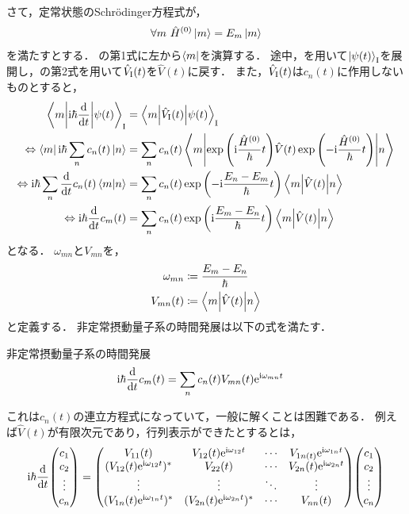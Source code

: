 \documentclass{report}
\begin{document}
  さて，定常状態のSchr\"odinger方程式が，
  \begin{align}
    \forall m\ \hat{H}^{(0)}\ket{m} = E_m\ket{m}
  \end{align}
  を満たすとする．
  の第1式に左から$\bra{m}$を演算する．
  途中，を用いて$\ket{\psi(t)}_{\mathrm{I}}$を展開し，の第2式を用いて$\hat{V}_{\mathrm{I}}(t)$を$\hat{V}(t)$に戻す．
  また，$\hat{V}_{\mathrm{I}}(t)$は$c_n(t)$に作用しないものとすると，
  \begin{align}
    \mel**{m}{\mathrm{i}\hbar\dv{t}}{\psi(t)}_{\mathrm{I}} &= \mel**{m}{\hat{V}_{\mathrm{I}}(t)}{\psi(t)}_{\mathrm{I}} \\ 
    \Leftrightarrow \bra{m}\mathrm{i}\hbar\sum_{n}c_n(t)\ket{n} &= \sum_{n}c_n(t)\mel**{m}{\exp\qty(\mathrm{i}\frac{\hat{H}^{(0)}}{\hbar}t)\hat{V}(t)\exp\qty(-\mathrm{i}\frac{\hat{H}^{(0)}}{\hbar}t)}{n} \\ 
    \Leftrightarrow \mathrm{i}\hbar\sum_{n}\dv{t}c_n(t)\braket{m}{n} &= \sum_{n}c_n(t)\exp\qty(-\mathrm{i}\frac{E_n - E_m}{\hbar}t)\mel**{m}{\hat{V}(t)}{n} \\ 
    \Leftrightarrow \mathrm{i}\hbar \dv{t}c_m(t) &= \sum_{n}c_n(t)\exp\qty(\mathrm{i}\frac{E_m - E_n}{\hbar}t)\mel**{m}{\hat{V}(t)}{n}
  \end{align}
  となる．
  $\omega_{mn}$と$V_{mn}$を，
  \begin{align}
    \omega_{mn} &\coloneqq \frac{E_m - E_n}{\hbar} \\ 
    V_{mn}(t) &\coloneqq \mel**{m}{\hat{V}(t)}{n}
  \end{align}
  と定義する．
  非定常摂動量子系の時間発展は以下の式を満たす．
  \begin{itembox}[l]{非定常摂動量子系の時間発展}
    \begin{align}
      \mathrm{i}\hbar\dv{t}c_m(t) &= \sum_{n}c_n(t)V_{mn}(t)\mathrm{e}^{\mathrm{i}\omega_{mn}t}\label{cnt-eq}
    \end{align}
  \end{itembox}
  これは$c_n(t)$の連立方程式になっていて，一般に解くことは困難である．
  例えば$\hat{V}(t)$が有限次元であり，行列表示ができたとするとは，
  \begin{align}
    \i\hbar\dv{t}\mqty(c_1 \\ c_2 \\ \vdots \\ c_n) 
    = \mqty(
      V_{11}(t) & V_{12}(t)\e^{\i\omega_{12}t} & \cdots & V_{1n(t)}\e^{\i\omega_{1n}t} \\ 
      (V_{12}(t)\e^{\i\omega_{12}t})^* & V_{22}(t) & \cdots & V_{2n}(t)\e^{\i\omega_{2n}t} \\ 
      \vdots & \vdots & \ddots & \vdots \\ 
      (V_{1n}(t)\e^{\i\omega_{1n}t})^* & (V_{2n}(t)\e^{\i\omega_{2n}t})^* & \cdots & V_{nn}(t)
      ) 
      \mqty(c_1 \\ c_2 \\ \vdots \\ c_n)\label{cnt-matrix}
  \end{align}
\end{document}

